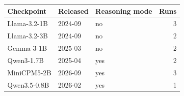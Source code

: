\begin{tabular}{@{}lllr@{}}
\toprule
Checkpoint & Released & Reasoning mode & Runs \\
\midrule
Llama-3.2-1B & 2024-09 & no & 3 \\
Llama-3.2-3B & 2024-09 & no & 2 \\
Gemma-3-1B & 2025-03 & no & 2 \\
Qwen3-1.7B & 2025-04 & yes & 2 \\
MiniCPM5-2B & 2026-09 & yes & 3 \\
Qwen3.5-0.8B & 2026-02 & yes & 1 \\
\bottomrule
\end{tabular}
